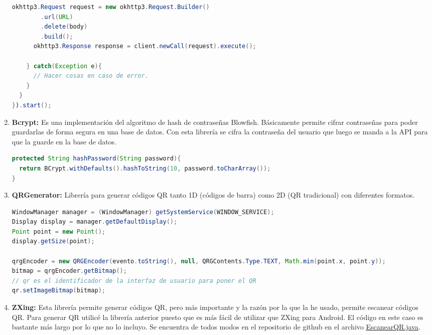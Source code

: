\begin{enumerate}
\begin{lstlisting}[language=Java,float=ht,caption={[Java] Ejemplo de llamada DELETE con OkHttp.},label=lst:okhttp]
      okhttp3.Request request = new okhttp3.Request.Builder()
        .url(URL)
        .delete(body)
        .build();
      okhttp3.Response response = client.newCall(request).execute();

    } catch(Exception e){
      // Hacer cosas en caso de error.
    }
  }
}).start();
\end{lstlisting}

\item \textbf{Bcrypt: } Es una implementación del algoritmo de hash de contraseñas Blowfish. Básicamente permite cifrar contraseñas para poder guardarlas de forma segura en una base de datos. Con esta librería se cifra la contraseña del usuario que luego se manda a la API para que la guarde en la base de datos.
\begin{lstlisting}[language=Java,float=ht,caption={[Java] Ejemplo de cifrado de la contraseña de un usuario.},label=lst:okhttp]
protected String hashPassword(String password){
  return BCrypt.withDefaults().hashToString(10, password.toCharArray());
}

\end{lstlisting}

\item \textbf{QRGenerator: } Librería para generar códigos QR tanto 1D (códigos de barra) como 2D (QR tradicional) con diferentes formatos.
\begin{lstlisting}[language=Java,float=ht,caption={[Java] Ejemplo de Código QR},label=lst:okhttp]
WindowManager manager = (WindowManager) getSystemService(WINDOW_SERVICE);
Display display = manager.getDefaultDisplay();
Point point = new Point();
display.getSize(point);

qrgEncoder = new QRGEncoder(evento.toString(), null, QRGContents.Type.TEXT, Math.min(point.x, point.y));
bitmap = qrgEncoder.getBitmap();
// qr es el identificador de la interfaz de usuario para poner el QR
qr.setImageBitmap(bitmap);
\end{lstlisting}

\item \textbf{ZXing: } Esta librería permite generar códigos QR, pero más importante y la razón por la que la he usado, permite escanear códigos QR. Para generar QR utilicé la librería anterior puesto que es más fácil de utilizar que ZXing para Android. El código en este caso es bastante más largo por lo que no lo incluyo. Se encuentra de todos modos en el repositorio de github en el archivo \href{https://github.com/FORGIS98/TFG/blob/main/Estublock/app/src/main/java/com/example/estublock/EscanearQRTutorial.java}{EscanearQR.java}.

\end{enumerate}

